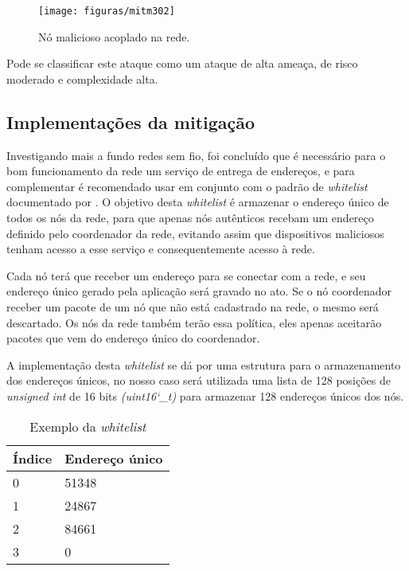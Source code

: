 \begin{figure}[ht]
	\centering
	\caption{N\'o malicioso acoplado na rede.}
	\texttt{[image: figuras/mitm302]}
    \label{fig:mitm302}
\end{figure}

\par Pode se classificar este ataque como um ataque de alta amea\c{c}a, de risco moderado e complexidade alta.

\subsection{Implementações da mitigação}
\par Investigando mais a fundo redes sem fio, foi conclu\'ido que \'e necess\'ario para o bom funcionamento da rede um servi\c{c}o de entrega de endere\c{c}os, e para complementar \'e recomendado usar em conjunto com o padrão de \emph{whitelist} documentado por . O objetivo desta \emph{whitelist} é armazenar o endere\c{c}o \'unico de todos os n\'os da rede, para que apenas n\'os aut\^enticos recebam um endere\c{c}o definido pelo coordenador da rede, evitando assim que dispositivos maliciosos tenham acesso a esse servi\c{c}o e consequentemente acesso \`a rede.

\par Cada nó terá que receber um endereço para se conectar com a rede, e seu endereço \'unico gerado pela aplica\c{c}\~ao será gravado no ato. Se o nó coordenador receber um pacote de um nó que não está cadastrado na rede, o mesmo será descartado. Os n\'os da rede tamb\'em ter\~ao essa pol\'itica, eles apenas aceitar\~ao pacotes que vem do endere\c{c}o \'unico do coordenador.

\par A implementa\c{c}\~ao desta \emph{whitelist} se d\'a por uma estrutura para o armazenamento dos endere\c{c}os \'unicos, no nosso caso ser\'a utilizada uma lista de 128 posi\c{c}\~oes de \emph{unsigned int} de 16 bits \emph{(uint16\char`_t)} para armazenar 128 endereços \'unicos dos nós.

\begin{table}[ht]
    \centering
    \caption{Exemplo da \emph{whitelist}}
    \label{tab:whitelist}
    
    \begin{tabular}{|l|l|}
    \hline
    Índice & Endere\c{c}o \'unico \\ \hline
    0      & 51348               \\ \hline
    1      & 24867               \\ \hline
    2      & 84661               \\ \hline
    3      & 0                   \\ \hline
    \end{tabular}
\end{table}

